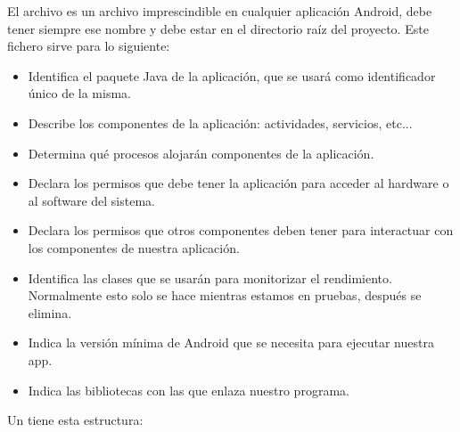 \documentclass[a4paper,12pt,spanish]{sphinxmanual}
\begin{document}
El archivo  es un archivo imprescindible en cualquier aplicación Android, debe tener siempre ese nombre y debe estar en el directorio raíz del proyecto. Este fichero sirve para lo siguiente:
\begin{itemize}
\item {} 
Identifica el paquete Java de la aplicación, que se usará como identificador único de la misma.

\item {} 
Describe los componentes de la aplicación: actividades, servicios, etc...

\item {} 
Determina qué procesos alojarán componentes de la aplicación.

\item {} 
Declara los permisos que debe tener la aplicación para acceder al hardware o al software del sistema.

\item {} 
Declara los permisos que otros componentes deben tener para interactuar con los componentes de nuestra aplicación.

\item {} 
Identifica las clases  que se usarán para monitorizar el rendimiento. Normalmente esto solo se hace mientras estamos en pruebas, después se elimina.

\item {} 
Indica la versión mínima de Android que se necesita para ejecutar nuestra app.

\item {} 
Indica las bibliotecas con las que enlaza nuestro programa.

\end{itemize}

Un  tiene esta estructura:
\end{document}
